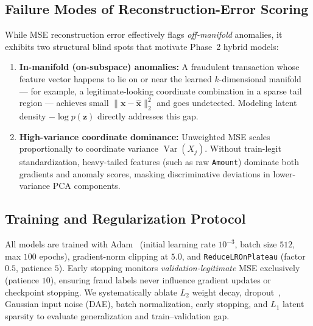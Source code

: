 \subsection{Failure Modes of Reconstruction-Error Scoring}
\label{sec:ae_failure_modes}

While MSE reconstruction error effectively flags \emph{off-manifold} anomalies,
it exhibits two structural blind spots that motivate Phase~2 hybrid models:
\begin{enumerate}
    \item \textbf{In-manifold (on-subspace) anomalies:} A fraudulent transaction
          whose feature vector happens to lie on or near the learned $k$-dimensional
          manifold --- for example, a legitimate-looking coordinate combination in a
          sparse tail region --- achieves small $\|\mathbf{x} - \hat{\mathbf{x}}\|_2^2$
          and goes undetected.  Modeling latent density $-\log p(\mathbf{z})$
          directly addresses this gap.
    \item \textbf{High-variance coordinate dominance:} Unweighted MSE scales
          proportionally to coordinate variance $\operatorname{Var}(X_j)$.
          Without train-legit standardization, heavy-tailed features (such as raw
          \texttt{Amount}) dominate both gradients and anomaly scores, masking
          discriminative deviations in lower-variance PCA components.
\end{enumerate}

\subsection{Training and Regularization Protocol}
\label{sec:ae_training_protocol}

All models are trained with Adam~\cite{kingma2015adam} (initial learning rate
$10^{-3}$, batch size $512$, max $100$ epochs), gradient-norm clipping at $5.0$,
and \texttt{ReduceLROnPlateau} (factor $0.5$, patience $5$).  Early stopping
monitors \emph{validation-legitimate} MSE exclusively (patience $10$), ensuring
fraud labels never influence gradient updates or checkpoint stopping.  We
systematically ablate $L_2$ weight decay, dropout~\cite{srivastava2014dropout},
Gaussian input noise (DAE), batch normalization, early stopping, and $L_1$
latent sparsity to evaluate generalization and train--validation gap.

